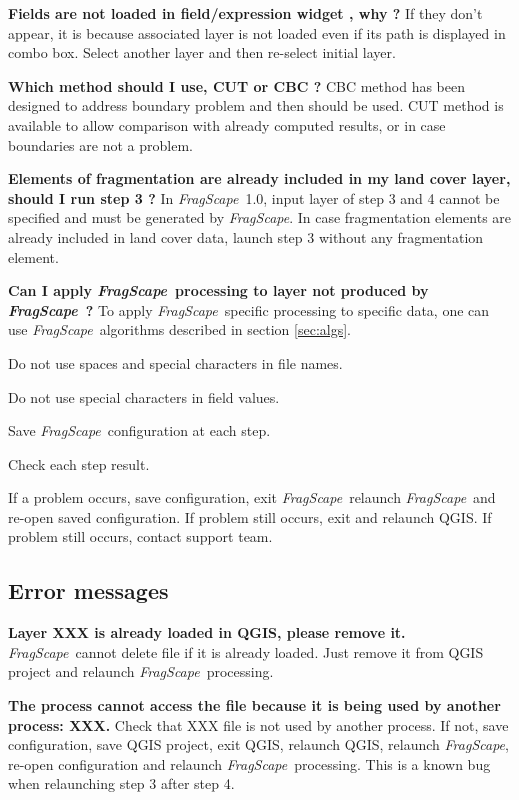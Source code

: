 \documentclass[11pt]{article}
\newcommand{\tool}{\emph{FragScape}}
\let\tempone\itemize
\let\temptwo\enditemize
\renewenvironment{itemize}{\tempone\addtolength{\itemsep}{-0.5\baselineskip}}{\temptwo}
\begin{document}
\begin{itemize}
\item \textbf{Fields are not loaded in field/expression widget , why ?} If they don't appear, it is because associated layer is not loaded even if its path is displayed in combo box. Select another layer and then re-select initial layer.

\item \textbf{Which method should I use, CUT or CBC ?} CBC method has been designed to address boundary problem and then should be used. CUT method is available to allow comparison with already computed results, or in case boundaries are not a problem.

\item \textbf{Elements of fragmentation are already included in my land cover layer, should I run step 3 ?} In \tool\ 1.0, input layer of step 3 and 4 cannot be specified and must be generated by \tool. In case fragmentation elements are already included in land cover data, launch step 3 without any fragmentation element. 

\item \textbf{Can I apply \tool\ processing to layer not produced by \tool\ ?} To apply \tool\ specific processing to specific data, one can use \tool\ algorithms described in section \ref{sec:algs}.

\end{itemize}

\begin{itemize}
    \item Do not use spaces and special characters in file names.
    \item Do not use special characters in field values.
    \item Save \tool\ configuration at each step.
    \item Check each step result.
    \item If a problem occurs, save configuration, exit \tool\, relaunch \tool\ and re-open saved configuration. If problem still occurs, exit and relaunch QGIS. If problem still occurs, contact support team.
\end{itemize}
\frameboxend

\subsection*{Error messages}

\begin{itemize}
    \item \textbf{\color{red}Layer XXX is already loaded in QGIS, please remove it.} \tool\  cannot delete file if it is already loaded. Just remove it from QGIS project and relaunch \tool\ processing.
    \item \textbf{\color{red}The process cannot access the file because it is being used by another process: XXX.} Check that XXX file is not used by another process. If not, save configuration, save QGIS project, exit QGIS, relaunch QGIS, relaunch \tool, re-open configuration and relaunch \tool\ processing. This is a known bug when relaunching step 3 after step 4.
\end{itemize}
\end{document}
